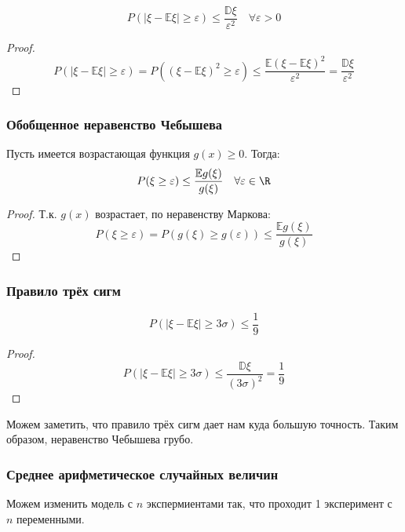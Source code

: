 \begin{theorem}
    \[P(|\xi - \mathbb{E}\xi| \geq \varepsilon) \leq \frac{\mathbb{D}\xi}{\varepsilon^2} \quad \forall \varepsilon > 0\]
\end{theorem}
\begin{proof}
    \[P(|\xi - \mathbb{E}\xi| \geq \varepsilon) = P((\xi - \mathbb{E}\xi)^2 \geq \varepsilon) \leq \frac{\mathbb{E}(\xi - \mathbb{E}\xi)^2}{\varepsilon^2} = \frac{\mathbb{D}\xi}{\varepsilon^2}\]
\end{proof}

\subsubsection{Обобщенное неравенство Чебышева}

\begin{theorem}
    Пусть имеется возрастающая функция \(g(x) \geq 0\). Тогда:
    \[P(\xi \geq \varepsilon) \leq \frac{\mathbb{E} g(\xi)}{g(\xi)} \quad \forall \varepsilon \in \R\]
\end{theorem}
\begin{proof}
    Т.к. \(g(x)\) возрастает, по неравенству Маркова:
    \[P(\xi \geq \varepsilon) = P(g(\xi) \geq g(\varepsilon)) \leq \frac{\mathbb{E} g(\xi)}{g(\xi)}\]
\end{proof}

\subsubsection{Правило трёх сигм}

\begin{theorem}
    \[P(|\xi - \mathbb{E}\xi| \geq 3 \sigma) \leq \frac{1}{9}\]
\end{theorem}
\begin{proof}
    \[P(|\xi - \mathbb{E}\xi| \geq 3 \sigma) \leq \frac{\mathbb{D}\xi}{(3\sigma)^2} = \frac{1}{9}\]
\end{proof}
\begin{remark}
    Можем заметить, что правило трёх сигм дает нам куда большую точность. Таким образом, неравенство Чебышева грубо.
\end{remark}

\subsubsection{Среднее арифметическое случайных величин}

Можем изменить модель с \(n\) экспермиентами так, что проходит 1 эксперимент с \(n\) переменными.

